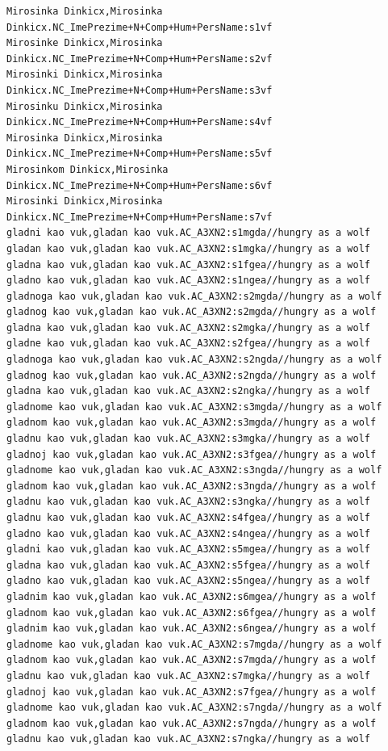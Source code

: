 \begin{verbatim}
Mirosinka Dinkicx,Mirosinka Dinkicx.NC_ImePrezime+N+Comp+Hum+PersName:s1vf
Mirosinke Dinkicx,Mirosinka Dinkicx.NC_ImePrezime+N+Comp+Hum+PersName:s2vf
Mirosinki Dinkicx,Mirosinka Dinkicx.NC_ImePrezime+N+Comp+Hum+PersName:s3vf
Mirosinku Dinkicx,Mirosinka Dinkicx.NC_ImePrezime+N+Comp+Hum+PersName:s4vf
Mirosinka Dinkicx,Mirosinka Dinkicx.NC_ImePrezime+N+Comp+Hum+PersName:s5vf
Mirosinkom Dinkicx,Mirosinka Dinkicx.NC_ImePrezime+N+Comp+Hum+PersName:s6vf
Mirosinki Dinkicx,Mirosinka Dinkicx.NC_ImePrezime+N+Comp+Hum+PersName:s7vf
gladni kao vuk,gladan kao vuk.AC_A3XN2:s1mgda//hungry as a wolf
gladan kao vuk,gladan kao vuk.AC_A3XN2:s1mgka//hungry as a wolf
gladna kao vuk,gladan kao vuk.AC_A3XN2:s1fgea//hungry as a wolf
gladno kao vuk,gladan kao vuk.AC_A3XN2:s1ngea//hungry as a wolf
gladnoga kao vuk,gladan kao vuk.AC_A3XN2:s2mgda//hungry as a wolf
gladnog kao vuk,gladan kao vuk.AC_A3XN2:s2mgda//hungry as a wolf
gladna kao vuk,gladan kao vuk.AC_A3XN2:s2mgka//hungry as a wolf
gladne kao vuk,gladan kao vuk.AC_A3XN2:s2fgea//hungry as a wolf
gladnoga kao vuk,gladan kao vuk.AC_A3XN2:s2ngda//hungry as a wolf
gladnog kao vuk,gladan kao vuk.AC_A3XN2:s2ngda//hungry as a wolf
gladna kao vuk,gladan kao vuk.AC_A3XN2:s2ngka//hungry as a wolf
gladnome kao vuk,gladan kao vuk.AC_A3XN2:s3mgda//hungry as a wolf
gladnom kao vuk,gladan kao vuk.AC_A3XN2:s3mgda//hungry as a wolf
gladnu kao vuk,gladan kao vuk.AC_A3XN2:s3mgka//hungry as a wolf
gladnoj kao vuk,gladan kao vuk.AC_A3XN2:s3fgea//hungry as a wolf
gladnome kao vuk,gladan kao vuk.AC_A3XN2:s3ngda//hungry as a wolf
gladnom kao vuk,gladan kao vuk.AC_A3XN2:s3ngda//hungry as a wolf
gladnu kao vuk,gladan kao vuk.AC_A3XN2:s3ngka//hungry as a wolf
gladnu kao vuk,gladan kao vuk.AC_A3XN2:s4fgea//hungry as a wolf
gladno kao vuk,gladan kao vuk.AC_A3XN2:s4ngea//hungry as a wolf
gladni kao vuk,gladan kao vuk.AC_A3XN2:s5mgea//hungry as a wolf
gladna kao vuk,gladan kao vuk.AC_A3XN2:s5fgea//hungry as a wolf
gladno kao vuk,gladan kao vuk.AC_A3XN2:s5ngea//hungry as a wolf
gladnim kao vuk,gladan kao vuk.AC_A3XN2:s6mgea//hungry as a wolf
gladnom kao vuk,gladan kao vuk.AC_A3XN2:s6fgea//hungry as a wolf
gladnim kao vuk,gladan kao vuk.AC_A3XN2:s6ngea//hungry as a wolf
gladnome kao vuk,gladan kao vuk.AC_A3XN2:s7mgda//hungry as a wolf
gladnom kao vuk,gladan kao vuk.AC_A3XN2:s7mgda//hungry as a wolf
gladnu kao vuk,gladan kao vuk.AC_A3XN2:s7mgka//hungry as a wolf
gladnoj kao vuk,gladan kao vuk.AC_A3XN2:s7fgea//hungry as a wolf
gladnome kao vuk,gladan kao vuk.AC_A3XN2:s7ngda//hungry as a wolf
gladnom kao vuk,gladan kao vuk.AC_A3XN2:s7ngda//hungry as a wolf
gladnu kao vuk,gladan kao vuk.AC_A3XN2:s7ngka//hungry as a wolf

\end{verbatim}
